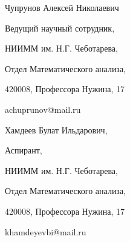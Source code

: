 Чупрунов Алексей Николаевич

Ведущий научный сотрудник,


 НИИММ им. Н.Г. Чеботарева,

 Отдел Математического анализа,

 420008, Профессора Нужина, 17

achuprunov@mail.ru

\medskip

Хамдеев Булат Ильдарович,

Аспирант,


 НИИММ им. Н.Г. Чеботарева,

 Отдел Математического анализа,

 420008, Профессора Нужина, 17

khamdeyevbi@mail.ru